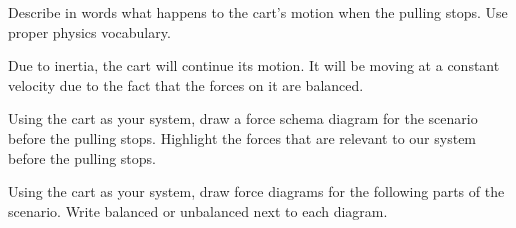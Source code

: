 \documentclass[]{exam}
\theoremstyle{definition}
\begin{document}
\begin{questions}
\question
Describe in words what happens to the cart's motion when the pulling stops. Use proper physics vocabulary.

\ifprintanswers
\else
\fillwithlines{3cm}
\fi

\begin{solution}
    Due to inertia, the cart will continue its motion. It will be moving at a constant velocity due to the fact that the forces on it are balanced.
\end{solution}

\question
Using the cart as your system, draw a force schema diagram for the scenario before the pulling stops. Highlight the forces that are relevant to our system before the pulling stops. 

\begin{solutionorbox}[3cm]
    
\end{solutionorbox}


\question
Using the cart as your system, draw force diagrams for the following parts of the scenario. Write balanced or unbalanced next to each diagram.

\end{questions}
\end{document}
